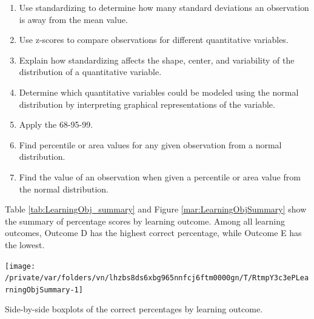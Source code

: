 \documentclass[12pt,english,nohyper]{tufte-handout}\usepackage[]{graphicx}\usepackage[]{color}
\newenvironment{knitrout}{}{} %
\begin{document}
\bigskip{}

\begin{fullwidth}
\begin{enumerate}[label=\Alph*.,itemsep=-\parsep,leftmargin=*]
  \item
Use standardizing to determine how many standard deviations an observation is away from the mean value.
\item Use z-scores to compare observations for different quantitative variables.
\item Explain how standardizing affects the shape, center, and variability of the distribution of a quantitative variable.
\item Determine which quantitative variables could be modeled using the normal distribution by interpreting graphical representations of the variable.
\item Apply the 68-95-99.
\item Find percentile or area values for any given observation from a normal distribution.
\item Find the value of an observation when given a percentile or area value from the normal distribution.

\end{enumerate}
\end{fullwidth}

\newpage{}

Table \ref{tab:LearningObj_summary} and Figure \ref{mar:LearningObjSummary} show the summary of percentage scores by learning outcome.
Among all learning outcomes, Outcome
D
has the highest correct percentage, while Outcome
E
has the lowest.



\begin{knitrout}
\color{fgcolor}\begin{marginfigure}
\texttt{[image: /private/var/folders/vn/lhzbs8ds6xbg965nnfcj6ftm0000gn/T/RtmpY3c3ePLearningObjSummary-1]} \caption[Side-by-side boxplots of the correct percentages by learning outcome]{Side-by-side boxplots of the correct percentages by learning outcome.}\label{mar:LearningObjSummary}
\end{marginfigure}


\end{knitrout}
\end{document}
